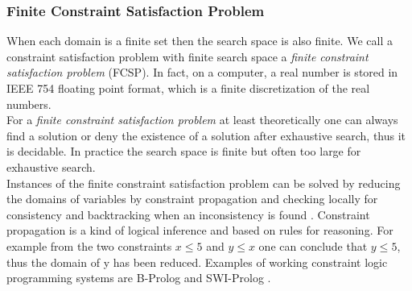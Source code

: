 \subsubsection{Finite Constraint Satisfaction Problem}
When each domain is a finite set then the search space is also finite. We call a constraint satisfaction problem with finite search space a \emph{finite constraint satisfaction problem} (FCSP). In fact, on a computer, a real number is stored in IEEE 754 floating point format, which is a finite discretization of the real numbers.\\
For a \emph{finite constraint satisfaction problem} at least theoretically one can always find a solution or deny the existence of a solution after exhaustive search, thus it is decidable. In practice the search space is finite but often too large for exhaustive search.\\
Instances of the finite constraint satisfaction problem can be solved by reducing the domains of variables by constraint propagation and checking locally for consistency and backtracking when an inconsistency is found \cite{Bessiere2006}. Constraint propagation is a kind of logical inference and based on rules for reasoning. For example from the two constraints $x\leq 5$ and $y \leq x$ one can conclude that $y\leq 5$, thus the domain of y has been reduced. Examples of working constraint logic programming systems are B-Prolog and SWI-Prolog \cite{wielemaker2011SWIProlog}.
